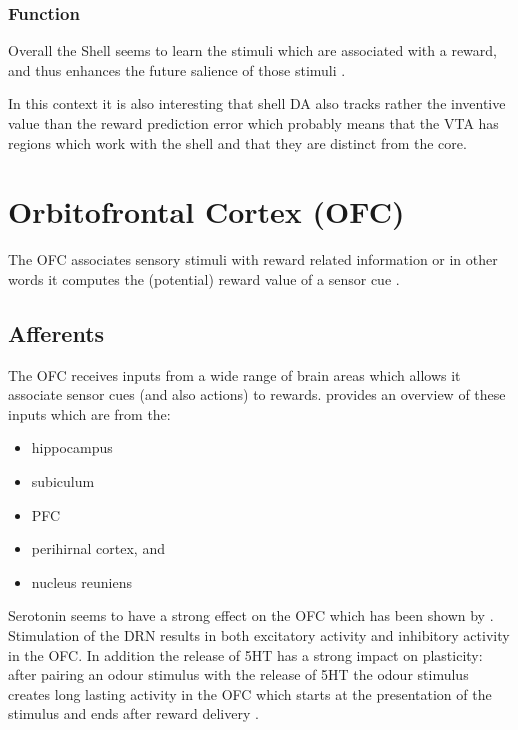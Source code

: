 \documentclass[12pt,a4paper]{article}
\begin{document}
\subsubsection{Function}
Overall the Shell seems to learn the stimuli which are associated with
a reward, and thus enhances the future salience of those stimuli
\citep{Cassidy2017}.

In this context it is also interesting that shell DA also tracks
rather the inventive value than the reward prediction error
\citep{Sackett2017} which probably means that the VTA has regions
which work with the shell and that they are distinct from the core.









\section{Orbitofrontal Cortex (OFC)}
The OFC associates sensory stimuli with reward related information
\citep{Schoenbaum.2009} or in other words it computes the (potential)
reward value of a sensor cue \citep{Wikenheiser2016,Bari2013}.

\subsection{Afferents}
The OFC receives inputs from a wide range of brain areas which allows
it associate sensor cues (and also actions) to
rewards. \citet{Wikenheiser2016} provides an overview of these inputs
which are from the:

\begin{itemize}
\item hippocampus
\item subiculum
\item PFC
\item perihirnal cortex, and
\item nucleus reuniens
\end{itemize}

Serotonin seems to have a strong effect on the OFC which has been
shown by \citet{Zhou2015}. Stimulation of the DRN results in both
excitatory activity and inhibitory activity in the OFC. In addition
the release of 5HT has a strong impact on plasticity: after pairing an
odour stimulus with the release of 5HT the odour stimulus creates long
lasting activity in the OFC which starts at the presentation of the
stimulus and ends after reward delivery \citep{Zhou2015}.
\end{document}
